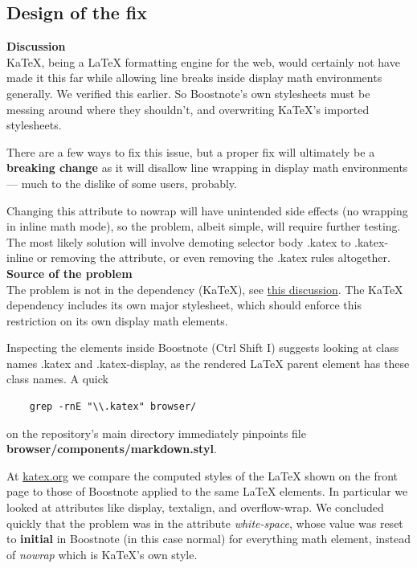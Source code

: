\documentclass[main.tex]{subfiles}
\begin{document}
\subsection{Design of the fix}

\textbf{Discussion}\\

KaTeX, being a LaTeX formatting engine for the web, would certainly not have made it this far while allowing line breaks inside display math environments generally. We verified this earlier. So Boostnote's own stylesheets must be messing around where they shouldn't, and overwriting KaTeX's imported stylesheets.

There are a few ways to fix this issue, but a proper fix will ultimately be a \textbf{breaking change} as it will disallow line wrapping in display math environments --- much to the dislike of some users, probably.

Changing this attribute to nowrap will have unintended side effects (no wrapping in inline math mode), so the problem, albeit simple, will require further testing. The most likely solution will involve demoting selector body .katex to .katex-inline or removing the attribute, or even removing the .katex rules altogether.\\

\textbf{Source of the problem}\\

The problem is not in the dependency (KaTeX), see \href{https://github.com/KaTeX/KaTeX/issues/1732}{this discussion}. The KaTeX dependency includes its own major stylesheet, which should enforce this restriction on its own display math elements.

Inspecting the elements inside Boostnote (Ctrl Shift I) suggests looking at class names .katex and .katex-display, as the rendered LaTeX parent element has these class names. A quick

\begin{lstlisting}
    grep -rnE "\\.katex" browser/
\end{lstlisting}

on the repository's main directory immediately pinpoints file \textbf{browser/components/markdown.styl}.

At \href{https://katex.org/}{katex.org} we compare the computed styles of the LaTeX shown on the front page to those of Boostnote applied to the same LaTeX elements. In particular we looked at attributes like display, textalign, and overflow-wrap. We concluded quickly that the problem was in the attribute \textit{white-space}, whose value was reset to \textbf{initial} in Boostnote (in this case normal) for everything math element, instead of \textit{nowrap} which is KaTeX's own style.
\end{document}
